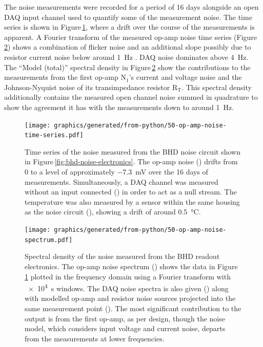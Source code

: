 The noise measurements were recorded for a period of \SI{16}{} days alongside an open DAQ input channel used to quantify some of the measurement noise. The time series is shown in Figure\,\ref{fig:op-amp-noise-time-series}, where a drift over the course of the measurements is apparent. A Fourier transform of the measured op-amp noise time series (Figure\,\ref{fig:op-amp-noise-spectrum}) shows a combination of flicker noise and an additional slope possibly due to resistor current noise below around \SI{1}{\hertz} \cite{Seifert2009}. DAQ noise dominates above \SI{4}{\hertz}. The ``Model (total)'' spectral density in Figure\,\ref{fig:op-amp-noise-spectrum} show the contributions to the measurements from the first op-amp $\textrm{N}_{1}$'s current and voltage noise and the Johnson-Nyquist noise of its transimpedance resistor $\textrm{R}_{\textrm{T}}$. This spectral density additionally contains the measured open channel noise summed in quadrature to show the agreement it has with the measurements down to around \SI{1}{\hertz}.

\begin{figure}
  \centering
  \texttt{[image: graphics/generated/from-python/50-op-amp-noise-time-series.pdf]}
  \caption[Time series of the noise measured from the balanced homodyne readout electronics]{\label{fig:op-amp-noise-time-series}Time series of the noise measured from the BHD noise circuit shown in Figure\,\ref{fig:bhd-noise-electronics}. The op-amp noise () drifts from \num{0} to a level of approximately \SI{-7.3}{\milli\volt} over the 16 days of measurements. Simultaneously, a DAQ channel was measured without an input connected () in order to act as a null stream. The temperature was also measured by a sensor within the same housing as the noise circuit (), showing a drift of around \SI{0.5}{\celsius}.}
\end{figure}

\begin{figure}
  \centering
  \texttt{[image: graphics/generated/from-python/50-op-amp-noise-spectrum.pdf]}
  \caption[Spectral density of the noise measured from the balanced homodyne readout electronics]{\label{fig:op-amp-noise-spectrum}Spectral density of the noise measured from the BHD readout electronics. The op-amp noise spectrum () shows the data in Figure\,\ref{fig:op-amp-noise-time-series} plotted in the frequency domain using a Fourier transform with \SI{e4}{\second} windows. The DAQ noise spectra is also given () along with modelled op-amp and resistor noise sources projected into the same measurement point (). The most significant contribution to the output is from the first op-amp, as per design, though the noise model, which considers input voltage and current noise, departs from the measurements at lower frequencies.}
\end{figure}

